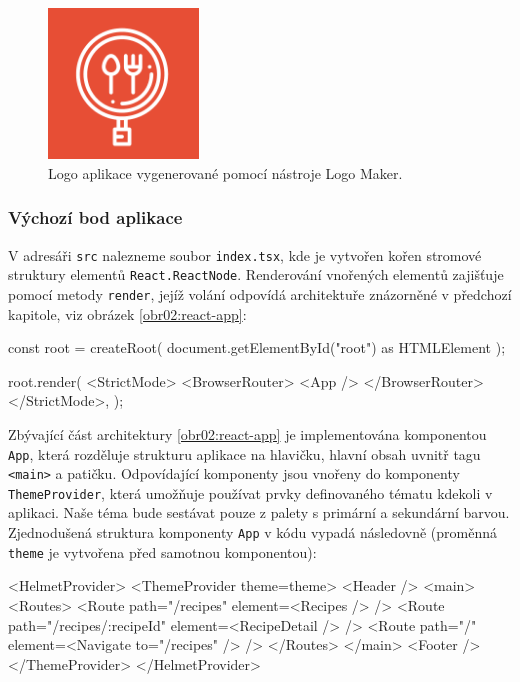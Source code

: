 \begin{figure}[h!]\centering
\includegraphics[width=40mm]{../img/mealinker-logo}
\caption{Logo aplikace vygenerované pomocí nástroje Logo Maker.}
\label{obr03:mealinker-logo}
\end{figure}

\subsubsection{Výchozí bod aplikace}

V adresáři \texttt{src} nalezneme soubor \texttt{index.tsx}, kde je vytvořen kořen stromové struktury elementů \texttt{React.ReactNode}. Renderování vnořených elementů zajišťuje pomocí metody \texttt{render}, jejíž volání odpovídá architektuře znázorněné v předchozí kapitole, viz obrázek \ref{obr02:react-app}:

\begingroup
\samepage
\begin{code}
const root = createRoot(
    document.getElementById("root") as HTMLElement
);

root.render(
  <StrictMode>
    <BrowserRouter>
      <App />
    </BrowserRouter>
  </StrictMode>,
);
\end{code}
\endgroup

Zbývající část architektury \ref{obr02:react-app} je implementována komponentou \texttt{App}, která rozděluje strukturu aplikace na hlavičku, hlavní obsah uvnitř tagu \texttt{<main>} a patičku. Odpovídající komponenty jsou vnořeny do komponenty \texttt{ThemeProvider}, která umožňuje používat prvky definovaného tématu kdekoli v aplikaci. Naše téma bude sestávat pouze z palety s primární a sekundární barvou. Zjednodušená struktura komponenty \texttt{App} v kódu vypadá následovně (proměnná \texttt{theme} je vytvořena před samotnou komponentou):

\begingroup
\samepage
\begin{code}
<HelmetProvider>
  <ThemeProvider theme={theme}>
    <Header />
    <main>
      <Routes>
        <Route path="/recipes" element={<Recipes />} />
        <Route path="/recipes/:recipeId" element={<RecipeDetail />} />
        <Route path="/" element={<Navigate to="/recipes" />} />
      </Routes>
    </main>
    <Footer />
  </ThemeProvider>
</HelmetProvider>
\end{code}
\endgroup

